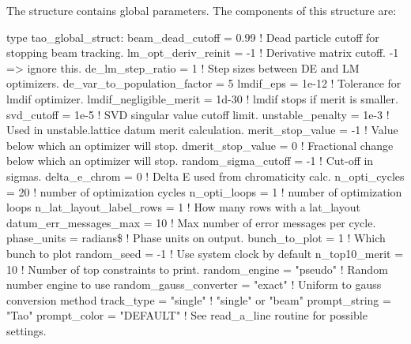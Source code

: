 {{{{{{{{
The  structure contains \tao global parameters. The components of this structure are:
\begin{example}
type tao_global_struct:
  beam_dead_cutoff = 0.99          ! Dead particle cutoff for stopping beam tracking.
  lm_opt_deriv_reinit = -1         ! Derivative matrix cutoff. -1 => ignore this.
  de_lm_step_ratio = 1             ! Step sizes between DE and LM optimizers.
  de_var_to_population_factor = 5 
  lmdif_eps = 1e-12                ! Tolerance for lmdif optimizer.
  lmdif_negligible_merit = 1d-30   ! lmdif stops if merit is smaller.
  svd_cutoff = 1e-5                ! SVD singular value cutoff limit.
  unstable_penalty = 1e-3          ! Used in unstable.lattice datum merit calculation.
  merit_stop_value = -1            ! Value below which an optimizer will stop.
  dmerit_stop_value = 0            ! Fractional change below which an optimizer will stop.
  random_sigma_cutoff = -1         ! Cut-off in sigmas.
  delta_e_chrom = 0                ! Delta E used from chromaticity calc.
  n_opti_cycles = 20               ! number of optimization cycles
  n_opti_loops = 1                 ! number of optimization loops
  n_lat_layout_label_rows = 1      ! How many rows with a lat_layout
  datum_err_messages_max = 10      ! Max number of error messages per cycle.
  phase_units = radians\$          ! Phase units on output.
  bunch_to_plot = 1                ! Which bunch to plot
  random_seed = -1                 ! Use system clock by default
  n_top10_merit = 10               ! Number of top constraints to print.
  random_engine = "pseudo"         ! Random number engine to use
  random_gauss_converter = "exact" ! Uniform to gauss conversion method
  track_type = "single"            ! "single" or "beam" 
  prompt_string = "Tao"
  prompt_color = "DEFAULT"         ! See read_a_line routine for possible settings.

\end{example}}}}}}}}}
